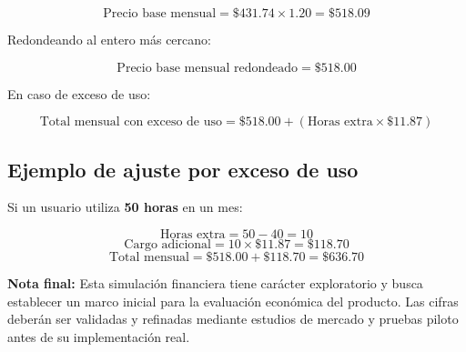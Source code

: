 \[
\text{Precio base mensual} = \$431.74 \times 1.20 = \$518.09
\]

Redondeando al entero más cercano:

\[
\text{Precio base mensual redondeado} = \$518.00
\]

\noindent En caso de exceso de uso:

\[
\text{Total mensual con exceso de uso} = \$518.00 + (\text{Horas extra} \times \$11.87)
\]

\subsection{Ejemplo de ajuste por exceso de uso}

Si un usuario utiliza \textbf{50 horas} en un mes:

\[
\text{Horas extra} = 50 - 40 = 10
\]
\[
\text{Cargo adicional} = 10 \times \$11.87 = \$118.70
\]
\[
\text{Total mensual} = \$518.00 + \$118.70 = \$636.70
\]

\begin{flushleft}
	\textbf{Nota final:} Esta simulación financiera tiene carácter exploratorio y busca establecer un marco inicial para la evaluación económica del producto. Las cifras deberán ser validadas y refinadas mediante estudios de mercado y pruebas piloto antes de su implementación real.
\end{flushleft}

